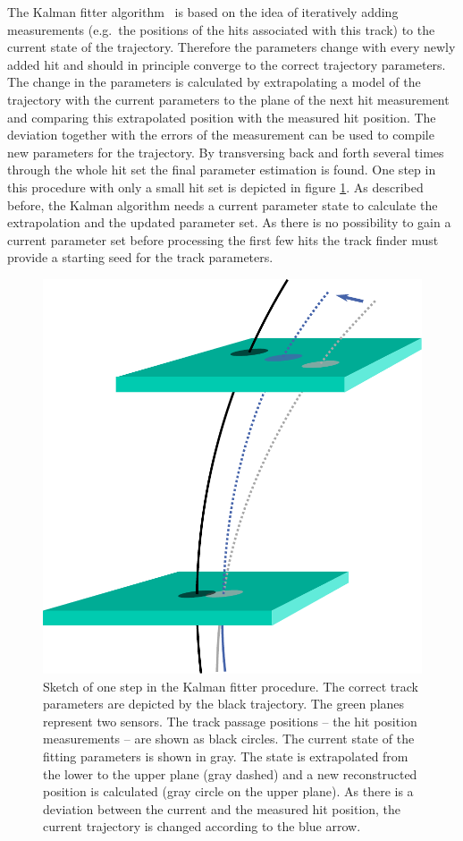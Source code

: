 The Kalman fitter algorithm~\cite{kalman} is based on the idea of iteratively adding measurements (e.g.\ the positions of the hits associated with this track) to the current state of the trajectory. Therefore the parameters change with every newly added hit and should in principle converge to the correct trajectory parameters. The change in the parameters is calculated by extrapolating a model of the trajectory with the current parameters to the plane of the next hit measurement and comparing this extrapolated position with the measured hit position. The deviation together with the errors of the measurement can be used to compile new parameters for the trajectory. By transversing back and forth several times through the whole hit set the final parameter estimation is found. One step in this procedure with only a small hit set is depicted in figure \ref{fig-kalman}. As described before, the Kalman algorithm needs a current parameter state to calculate the extrapolation and the updated parameter set. As there is no possibility to gain a current parameter set before processing the first few hits the track finder must provide a starting seed for the track parameters.

\begin{figure}
 \centering
 \includegraphics[width=0.6\linewidth]{figures/theory/kalman.pdf}
 \caption[One step of the Kalman fitter procedure.]{Sketch of one step in the Kalman fitter procedure. The correct track parameters are depicted by the black trajectory. The green planes represent two sensors. The track passage positions -- the hit position measurements -- are shown as black circles. The current state of the fitting parameters is shown in gray. The state is extrapolated from the lower to the upper plane (gray dashed) and a new reconstructed position is calculated (gray circle on the upper plane). As there is a deviation between the current and the measured hit position, the current trajectory is changed according to the blue arrow.}
 \label{fig-kalman}
\end{figure}

